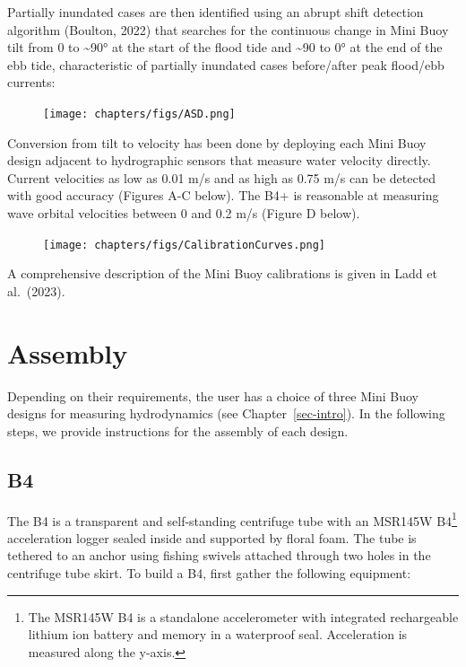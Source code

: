 \documentclass[
  letterpaper,
  DIV=11,
  numbers=noendperiod]{scrreprt}
\begin{document}
Partially inundated cases are then identified using an abrupt shift
detection algorithm (Boulton, 2022) that searches for the continuous
change in Mini Buoy tilt from 0 to \textasciitilde90° at the start of
the flood tide and \textasciitilde90 to 0° at the end of the ebb tide,
characteristic of partially inundated cases before/after peak flood/ebb
currents:

\begin{figure}

{\centering \texttt{[image: chapters/figs/ASD.png]}

}

\end{figure}

Conversion from tilt to velocity has been done by deploying each Mini
Buoy design adjacent to hydrographic sensors that measure water velocity
directly. Current velocities as low as 0.01 m/s and as high as 0.75 m/s
can be detected with good accuracy (Figures A-C below). The B4+ is
reasonable at measuring wave orbital velocities between 0 and 0.2 m/s
(Figure D below).

\begin{figure}

{\centering \texttt{[image: chapters/figs/CalibrationCurves.png]}

}

\end{figure}

A comprehensive description of the Mini Buoy calibrations is given in
Ladd et al.~(2023).


\hypertarget{assembly}{%
\chapter{Assembly}\label{assembly}}

Depending on their requirements, the user has a choice of three Mini
Buoy designs for measuring hydrodynamics (see Chapter~\ref{sec-intro}).
In the following steps, we provide instructions for the assembly of each
design.

\hypertarget{b4}{%
\section{B4}\label{b4}}

The B4 is a transparent and self-standing centrifuge tube with an
MSR145W B4\footnote{The MSR145W B4 is a standalone accelerometer with
  integrated rechargeable lithium ion battery and memory in a waterproof
  seal. Acceleration is measured along the y-axis.} acceleration logger
sealed inside and supported by floral foam. The tube is tethered to an
anchor using fishing swivels attached through two holes in the
centrifuge tube skirt. To build a B4, first gather the following
equipment:
\end{document}
